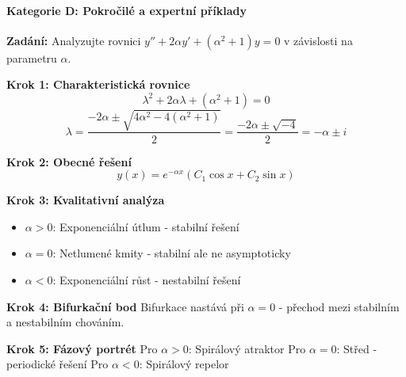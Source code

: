 \paragraph{Kategorie D: Pokročilé a expertní příklady}

\begin{example}
\label{ex:rovnice-s-parametrem}

\noindent\textbf{Zadání:} Analyzujte rovnici $y'' + 2\alpha y' + (\alpha^2 + 1)y = 0$ v závislosti na parametru $\alpha$.

\vspace{1.5\baselineskip}

\noindent\textbf{Krok 1: Charakteristická rovnice}
\[
\lambda^2 + 2\alpha\lambda + (\alpha^2 + 1) = 0
\]
\[
\lambda = \frac{-2\alpha \pm \sqrt{4\alpha^2 - 4(\alpha^2 + 1)}}{2} = \frac{-2\alpha \pm \sqrt{-4}}{2} = -\alpha \pm i
\]

\vspace{1\baselineskip}

\noindent\textbf{Krok 2: Obecné řešení}
\[
y(x) = e^{-\alpha x}(C_1 \cos x + C_2 \sin x)
\]

\vspace{1\baselineskip}

\noindent\textbf{Krok 3: Kvalitativní analýza}
\begin{itemize}
\item \textbf{$\alpha > 0$}: Exponenciální útlum - stabilní řešení
\item \textbf{$\alpha = 0$}: Netlumené kmity - stabilní ale ne asymptoticky
\item \textbf{$\alpha < 0$}: Exponenciální růst - nestabilní řešení
\end{itemize}

\vspace{1\baselineskip}

\noindent\textbf{Krok 4: Bifurkační bod}
Bifurkace nastává při $\alpha = 0$ - přechod mezi stabilním a nestabilním chováním.

\vspace{1\baselineskip}

\noindent\textbf{Krok 5: Fázový portrét}
Pro $\alpha > 0$: Spirálový atraktor
Pro $\alpha = 0$: Střed - periodické řešení
Pro $\alpha < 0$: Spirálový repelor

\end{example}

